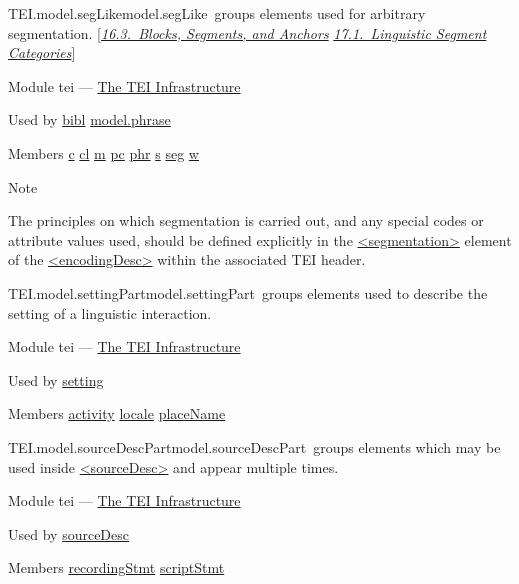 \begin{reflist}
\item[]\begin{specHead}{TEI.model.segLike}{model.segLike} groups elements used for arbitrary segmentation. [\textit{\hyperref[SASE]{16.3.\ Blocks, Segments, and Anchors}} \textit{\hyperref[AILC]{17.1.\ Linguistic Segment Categories}}]\end{specHead} 
    \item[{Module}]
  tei — \hyperref[ST]{The TEI Infrastructure}
    \item[{Used by}]
  \hyperref[TEI.bibl]{bibl} \hyperref[TEI.model.phrase]{model.phrase}
    \item[{Members}]
  \hyperref[TEI.c]{c} \hyperref[TEI.cl]{cl} \hyperref[TEI.m]{m} \hyperref[TEI.pc]{pc} \hyperref[TEI.phr]{phr} \hyperref[TEI.s]{s} \hyperref[TEI.seg]{seg} \hyperref[TEI.w]{w}
    \item[{Note}]
  \par
The principles on which segmentation is carried out, and any special codes or attribute values used, should be defined explicitly in the \hyperref[TEI.segmentation]{<segmentation>} element of the \hyperref[TEI.encodingDesc]{<encodingDesc>} within the associated TEI header.
\end{reflist}  
\begin{reflist}
\item[]\begin{specHead}{TEI.model.settingPart}{model.settingPart} groups elements used to describe the setting of a linguistic interaction.\end{specHead} 
    \item[{Module}]
  tei — \hyperref[ST]{The TEI Infrastructure}
    \item[{Used by}]
  \hyperref[TEI.setting]{setting}
    \item[{Members}]
  \hyperref[TEI.activity]{activity} \hyperref[TEI.locale]{locale} \hyperref[TEI.placeName]{placeName}
\end{reflist}  
\begin{reflist}
\item[]\begin{specHead}{TEI.model.sourceDescPart}{model.sourceDescPart} groups elements which may be used inside \hyperref[TEI.sourceDesc]{<sourceDesc>} and appear multiple times.\end{specHead} 
    \item[{Module}]
  tei — \hyperref[ST]{The TEI Infrastructure}
    \item[{Used by}]
  \hyperref[TEI.sourceDesc]{sourceDesc}
    \item[{Members}]
  \hyperref[TEI.recordingStmt]{recordingStmt} \hyperref[TEI.scriptStmt]{scriptStmt}
\end{reflist}  

